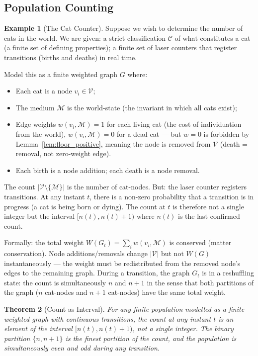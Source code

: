 \documentclass[11pt,twocolumn,a4paper]{article}
\theoremstyle{plain}
\newtheorem{theorem}{Theorem}[section]
\theoremstyle{definition}
\newtheorem{example}[theorem]{Example}
\theoremstyle{remark}
\newcommand{\med}{\mathcal{M}}
\newcommand{\Vcal}{\mathcal{V}}
\begin{document}
\subsection{Population Counting}

\begin{example}[The Cat Counter]
\label{ex:cats}
Suppose we wish to determine the number of cats in the world. We are given:
a strict classification $\mathcal{C}$ of what constitutes a cat (a finite
set of defining properties); a finite set of laser counters that register
transitions (births and deaths) in real time.

Model this as a finite weighted graph $G$ where:
\begin{itemize}
  \item Each cat is a node $v_i \in \Vcal$;
  \item The medium $\med$ is the world-state (the invariant in which all
  cats exist);
  \item Edge weights $w(v_i, \med) = 1$ for each living cat (the cost of
  individuation from the world), $w(v_i, \med) = 0$ for a dead cat --- but
  $w = 0$ is forbidden by Lemma~\ref{lem:floor_positive}, meaning the node
  is removed from $\Vcal$ (death = removal, not zero-weight edge).
  \item Each birth is a node addition; each death is a node removal.
\end{itemize}

The count $|\Vcal \setminus \{\med\}|$ is the number of cat-nodes. But:
the laser counter registers transitions. At any instant $t$, there is a
non-zero probability that a transition is in progress (a cat is being born
or dying). The count at $t$ is therefore not a single integer but the
interval $[n(t), n(t)+1)$ where $n(t)$ is the last confirmed count.

Formally: the total weight $W(G_t) = \sum_i w(v_i, \med)$ is conserved
(matter conservation). Node additions/removals change $|\Vcal|$ but not
$W(G)$ instantaneously --- the weight must be redistributed from the
removed node's edges to the remaining graph. During a transition, the
graph $G_t$ is in a reshuffling state: the count is simultaneously $n$ and
$n+1$ in the sense that both partitions of the graph ($n$ cat-nodes and
$n+1$ cat-nodes) have the same total weight.
\end{example}

\begin{theorem}[Count as Interval]
\label{thm:count_interval}
For any finite population modelled as a finite weighted graph with continuous
transitions, the count at any instant $t$ is an element of the interval
$[n(t), n(t)+1)$, not a single integer. The binary partition
$\{n, n+1\}$ is the finest partition of the count, and the population is
simultaneously even and odd during any transition.
\end{theorem}
\end{document}
